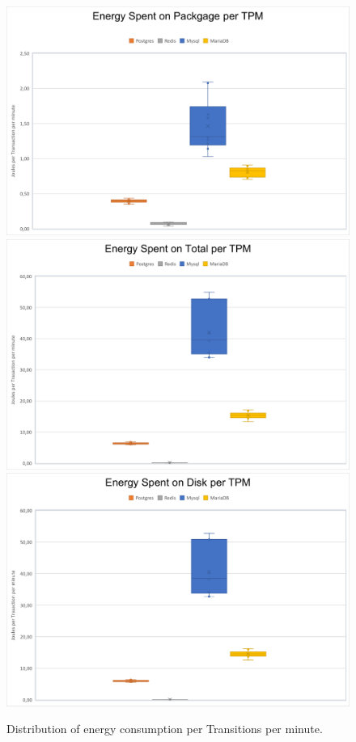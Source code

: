 \begin{figure}[h!]
\centering
\caption{Distribution of energy consumption per Transitions per minute.}
\includegraphics[width=0.6\columnwidth]{results/boxplot/Packgage-tpm.png}
\includegraphics[width=0.6\columnwidth]{results/boxplot/total-tpm.png}
\includegraphics[width=0.6\columnwidth]{results/boxplot/Disk-tpm.png}
\label{fig:bocplottrans}	
\end{figure}

